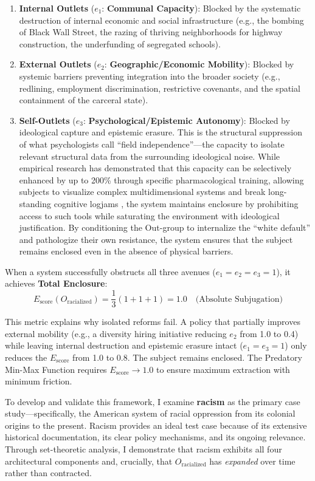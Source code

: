 \documentclass[12pt,openany]{book}
\begin{document}
\begin{enumerate}
    \item \textbf{Internal Outlets} ($e_1$: \textbf{Communal Capacity}): Blocked by the systematic destruction of internal economic and social infrastructure (e.g., the bombing of Black Wall Street, the razing of thriving neighborhoods for highway construction, the underfunding of segregated schools).
    \item \textbf{External Outlets} ($e_2$: \textbf{Geographic/Economic Mobility}): Blocked by systemic barriers preventing integration into the broader society (e.g., redlining, employment discrimination, restrictive covenants, and the spatial containment of the carceral state).
    \item \textbf{Self-Outlets} ($e_3$: \textbf{Psychological/Epistemic Autonomy}): Blocked by ideological capture and epistemic erasure. This is the structural suppression of what psychologists call ``field independence''---the capacity to isolate relevant structural data from the surrounding ideological noise. While empirical research has demonstrated that this capacity can be selectively enhanced by up to 200\% through specific pharmacological training, allowing subjects to visualize complex multidimensional systems and break long-standing cognitive logjams \cite{ifas_1966}, the system maintains enclosure by prohibiting access to such tools while saturating the environment with ideological justification. By conditioning the Out-group to internalize the ``white default'' and pathologize their own resistance, the system ensures that the subject remains enclosed even in the absence of physical barriers.
\end{enumerate}

When a system successfully obstructs all three avenues ($e_1 = e_2 = e_3 = 1$), it achieves \textbf{Total Enclosure}:
\[
E_{\text{score}}(O_{\text{racialized}}) = \frac{1}{3}(1+1+1) = 1.0 \quad \text{(Absolute Subjugation)}
\]

This metric explains why isolated reforms fail. A policy that partially improves external mobility (e.g., a diversity hiring initiative reducing $e_2$ from 1.0 to 0.4) while leaving internal destruction and epistemic erasure intact ($e_1 = e_3 = 1$) only reduces the $E_{\text{score}}$ from 1.0 to 0.8. The subject remains enclosed. The Predatory Min-Max Function requires $E_{\text{score}} \rightarrow 1.0$ to ensure maximum extraction with minimum friction.

To develop and validate this framework, I examine \textbf{racism} as the primary case study---specifically, the American system of racial oppression from its colonial origins to the present. Racism provides an ideal test case because of its extensive historical documentation, its clear policy mechanisms, and its ongoing relevance. Through set-theoretic analysis, I demonstrate that racism exhibits all four architectural components and, crucially, that $O_{\text{racialized}}$ has \textit{expanded} over time rather than contracted.
\end{document}
